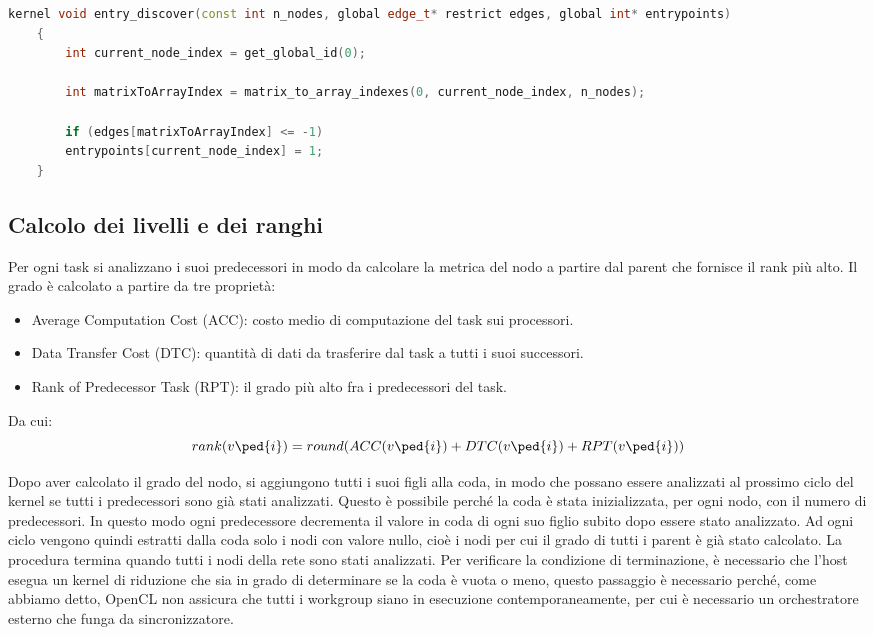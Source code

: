 \begin{lstlisting}[language=C++, caption={entry\_discover kernel},captionpos=b]
	kernel void entry_discover(const int n_nodes, global edge_t* restrict edges, global int* entrypoints)
	{
		int current_node_index = get_global_id(0);
		
		int matrixToArrayIndex = matrix_to_array_indexes(0, current_node_index, n_nodes);
		
		if (edges[matrixToArrayIndex] <= -1)
		entrypoints[current_node_index] = 1;
	}
\end{lstlisting}

\subsection{Calcolo dei livelli e dei ranghi}
Per ogni task si analizzano i suoi predecessori in modo da calcolare la metrica del nodo a partire dal parent che fornisce il rank più alto.
Il grado è calcolato a partire da tre proprietà:
\begin{itemize}
	\item Average Computation Cost (ACC): costo medio di computazione del task sui processori.
	\item Data Transfer Cost (DTC): quantità di dati da trasferire dal task a tutti i suoi successori.
	\item Rank of Predecessor Task (RPT): il grado più alto fra i predecessori del task.
\end{itemize}
Da cui:
\begin{equation}\label{Grado}
	rank(v\ped{i}) = round(ACC(v\ped{i}) + DTC(v\ped{i}) + RPT(v\ped{i}))
\end{equation}

Dopo aver calcolato il grado del nodo, si aggiungono tutti i suoi figli alla coda, in modo che possano essere analizzati al prossimo ciclo del kernel se tutti i predecessori sono già stati analizzati. Questo è possibile perché la coda è stata inizializzata, per ogni nodo, con il numero di predecessori. In questo modo ogni predecessore decrementa il valore in coda di ogni suo figlio subito dopo essere stato analizzato. Ad ogni ciclo vengono quindi estratti dalla coda solo i nodi con valore nullo, cioè i nodi per cui il grado di tutti i parent è già stato calcolato. La procedura termina quando tutti i nodi della rete sono stati analizzati. Per verificare la condizione di terminazione, è necessario che l'host esegua un kernel di riduzione che sia in grado di determinare se la coda è vuota o meno, questo passaggio è necessario perché, come abbiamo detto, OpenCL non assicura che tutti i workgroup siano in esecuzione contemporaneamente, per cui è necessario un orchestratore esterno che funga da sincronizzatore.

